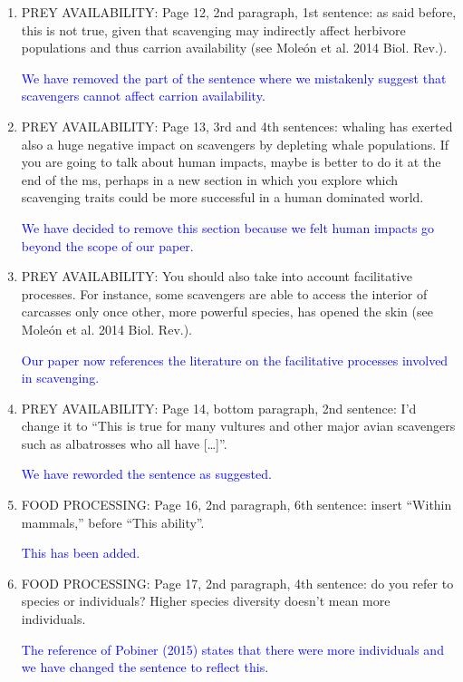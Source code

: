 \documentclass[12pt,letterpaper]{article}
\begin{document}
\begin{enumerate}
\item{PREY AVAILABILITY:} Page 12, 2nd paragraph, 1st sentence: as said before, this is not true, given that scavenging may indirectly affect herbivore populations and thus carrion availability (see Mole\'{o}n et al. 2014 Biol. Rev.).

\textcolor{blue}{We have removed the part of the sentence where we mistakenly suggest that scavengers cannot affect carrion availability.}

\item{PREY AVAILABILITY:} Page 13, 3rd and 4th sentences: whaling has exerted also a huge negative impact on scavengers by depleting whale populations. If you are going to talk about human impacts, maybe is better to do it at the end of the ms, perhaps in a new section in which you explore which scavenging traits could be more successful in a human dominated world.

\textcolor{blue}{We have decided to remove this section because we felt human impacts go beyond the scope of our paper.}

\item{PREY AVAILABILITY:} You should also take into account facilitative processes. For instance, some scavengers are able to access the interior of carcasses only once other, more powerful species, has opened the skin (see Mole\'{o}n et al. 2014 Biol. Rev.).

\textcolor{blue}{Our paper now references the literature on the facilitative processes involved in scavenging.}

\item{PREY AVAILABILITY:} Page 14, bottom paragraph, 2nd sentence: I'd change it to ``This is true for many vultures and other major avian scavengers such as albatrosses who all have […]''.

\textcolor{blue}{We have reworded the sentence as suggested.}

\item{FOOD PROCESSING:} Page 16, 2nd paragraph, 6th sentence: insert ``Within mammals,'' before ``This ability''.

\textcolor{blue}{This has been added.}

\item{FOOD PROCESSING:} Page 17, 2nd paragraph, 4th sentence: do you refer to species or individuals? Higher species diversity doesn't mean more individuals.

\textcolor{blue}{The reference of Pobiner (2015) states that there were more individuals and we have changed the sentence to reflect this.}


\end{enumerate}
\end{document}
